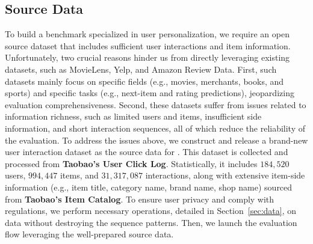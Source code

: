 \subsection{Source Data}
To build a benchmark specialized in user personalization, we require an open source dataset that includes sufficient user interactions and item information. Unfortunately, two crucial reasons hinder us from directly leveraging existing datasets, such as MovieLens, Yelp, and Amazon Review Data.
First, such datasets mainly focus on specific fields (e.g., movies, merchants, books, and sports) and specific tasks (e.g., next-item and rating predictions), jeopardizing evaluation comprehensiveness.
Second, these datasets suffer from issues related to information richness, such as limited users and items, insufficient side information, and short interaction sequences, all of which reduce the reliability of the evaluation.
To address the issues above, we construct and release a brand-new user interaction dataset as the source data for \name. This dataset is collected and processed from \textbf{Taobao's User Click Log}. Statistically, it includes $184,520$ users, $994,447$ items, and $31,317,087$ interactions, along with extensive item-side information (e.g., item title, category name, brand name, shop name) sourced from \textbf{Taobao's Item Catalog}. 
To ensure user privacy and comply with regulations, we perform necessary operations, detailed in Section~\ref{sec:data}, on data without destroying the sequence patterns. Then, we launch the evaluation flow leveraging the well-prepared source data. 


